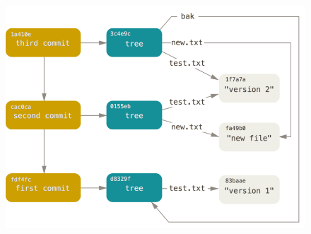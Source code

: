 \documentclass[12pt,oneside]{article}
\begin{document}
\begin{description}
  \begin{figure}[H]
    \centering
    \includegraphics[width=\textwidth]{data-model-3.png}
    \label{fig:commit-objects}
  \end{figure}
\end{description}
\end{document}
